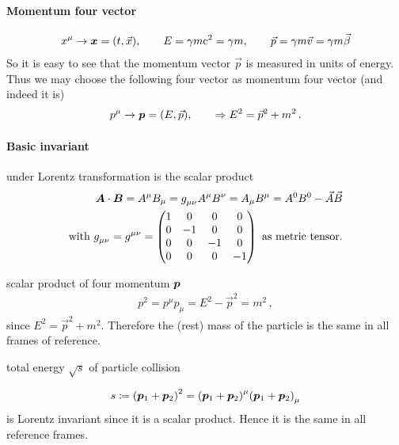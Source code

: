 \paragraph{Momentum four vector}
\begin{align}
    x^\mu \rightarrow {\bm{x}} = \qty( t, \vec x), \qquad E = \gamma m \mathrm{c}^2 = \gamma m, \qquad \vec p = \gamma m \vec v = \gamma m \vec \beta
\end{align}
So it is easy to see that the momentum vector $\vec p$ is measured in units of energy. Thus we may choose the following four vector as momentum four vector (and indeed it is)
\begin{align}
    p^\mu \rightarrow {\bm{p}} = \qty( E, \vec p ), \qquad \Rightarrow E^2 = \vec p^2 +m^2\,.
\end{align}
\paragraph{Basic invariant} under Lorentz transformation is the scalar product
\begin{align}
    \fvec A \cdot \fvec B = A^\mu B_\mu = \tensor{g}{_\mu_\nu} A^\mu B^\nu = A_\mu B^\mu = A^0B^0 - \vec A \vec B\\
    \text{with } \tensor{g}{_\mu_\nu} = \tensor{g}{^\mu^\nu} = \mat{1 & 0 & 0 & 0 \\ 0 & -1 & 0 & 0 \\ 0 & 0 & -1 & 0 \\ 0 & 0 & 0 & -1} \text{ as metric tensor.} \nonumber
\end{align}
\begin{example}
    scalar product of four momentum ${\bm{p}}$
    \begin{align}
        p^2 = p^\mu p_\mu = E^2 - \vec p^2 = m^2\,,
    \end{align}
    since $E^2 = \vec p^2 +m^2$. Therefore the (rest) mass of the particle is the same in all frames of reference.
\end{example}
\begin{example}
    total energy $\sqrt s$ of particle collision
    \begin{center}
    \end{center}
    \begin{align}
        s \coloneqq \qty( {\bm{p}}_1 + {\bm{p}}_2)^2 = \qty( {\bm{p}}_1 + {\bm{p}}_2 )^\mu \qty( {\bm{p}}_1 + {\bm{p}}_2 )_\mu 
    \end{align}
    is Lorentz invariant since it is a scalar product. Hence it is the same in all reference frames.
\end{example}
